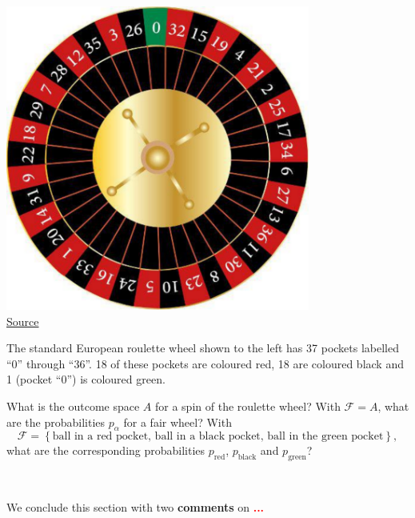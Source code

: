 \documentclass[12 pt]{article}
\newcommand{\cF}{\ensuremath{\mathcal F} }
\newcommand{\al}{\ensuremath{\alpha} }
\newcommand{\TODO}[1]{\textcolor{red}{\textbf{#1}}}
\begin{document}
\begin{minipage}{0.4\textwidth}
  \begin{center}
    \includegraphics[width=0.75\textwidth]{figs/roulette.pdf} \\
    \href{https://www.vecteezy.com/vector-art/658761-casino-roulette-wheel}{Source}
  \end{center}
\end{minipage}%
\begin{minipage}{0.5\textwidth}
  The standard European roulette wheel shown to the left has 37 pockets labelled ``0'' through ``36''.
  18 of these pockets are coloured red, 18 are coloured black and 1 (pocket ``0'') is coloured green.
\end{minipage}

\noindent What is the outcome space $A$ for a spin of the roulette wheel?
With $\cF = A$, what are the probabilities $p_{\al}$ for a fair wheel?
With
\begin{equation*}
  \cF = \left\{\mbox{ball in a red pocket, ball in a black pocket, ball in the green pocket}\right\},
\end{equation*}
what are the corresponding probabilities $p_{\text{red}}$, $p_{\text{black}}$ and $p_{\text{green}}$?
\begin{mdframed}
  \ \\[100 pt]
\end{mdframed}

We conclude this section with two \textbf{comments} on 
\TODO{...}
\end{document}
